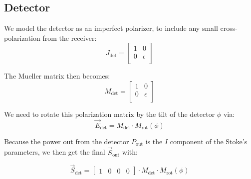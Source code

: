 \subsection{Detector}

We model the detector as an imperfect polarizer, to include any small cross-polarization from the receiver:
\begin{equation}
    J_{\text{det}} = \begin{bmatrix}
    1 & 0 \\
    0 & \epsilon\\
  \end{bmatrix}
\end{equation}

The Mueller matrix then becomes:
\begin{equation}
    M_{\text{det}} = \begin{bmatrix}
    1 & 0 \\
    0 & \epsilon\\
  \end{bmatrix}
\end{equation}

We need to rotate this polarization matrix by the tilt of the detector $\phi$ via:
\begin{equation}
    \vec{E}_{\text{det}} = M_{\text{det}}\cdot M_{\text{rot}}(\phi)
\end{equation}

Because the power out from the detector $P_{\text{out}}$ is the $I$ component of the Stoke's parameters, we then get the final $\vec{S}_{\text{out}}$ with:

\begin{equation}
    \vec{S}_{\text{det}} = \begin{bmatrix}
    1 & 0 & 0 & 0
  \end{bmatrix} \cdot M_{\text{det}} \cdot M_{\text{rot}}(\phi)
\end{equation}
